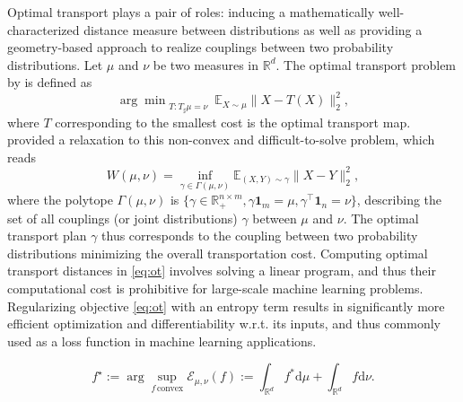 Optimal transport plays a pair of roles: inducing a mathematically well-characterized distance measure between distributions as well as providing a geometry-based approach to realize couplings between two probability distributions.
Let $\mu$ and $\nu$ be two measures in $\mathbb{R}^d$. 
The optimal transport problem by \citet{monge1781histoire} is defined as
\begin{equation}\label{eq:monge}
    {\arg \min}_{T : T_\sharp \mu = \nu} \enspace \mathbb{E}_{X \sim \mu}\|X-T(X)\|^2_2,
\end{equation}
where $T$ corresponding to the smallest cost is the optimal transport map.
\citet{kantorovich1942transfer} provided a relaxation to this non-convex and difficult-to-solve problem, which reads
\begin{equation}\label{eq:ot}
W(\mu, \nu)= \inf _{\gamma \in \Gamma(\mu, \nu)} \mathbb{E}_{(X, Y) \sim \gamma}\|X-Y\|^2_2,
\end{equation}
where the polytope $\Gamma(\mu, \nu)$ is $\{\gamma \in\mathbb{R}^{n \times m}_+, \gamma\mathbf{1}_m =\mu, \gamma^\top\mathbf{1}_n=\nu\}$, describing the set of all couplings (or joint distributions) $\gamma$ between $\mu$ and $\nu$.
The optimal transport plan $\gamma$ thus corresponds to the coupling between two probability distributions minimizing the overall transportation cost. 
Computing optimal transport distances in \eqref{eq:ot} involves solving a linear program, and thus their computational cost is prohibitive for large-scale machine learning problems. Regularizing objective \eqref{eq:ot} with an entropy term results in significantly more efficient optimization \citep{cuturi2013sinkhorn} and differentiability w.r.t. its inputs, and thus commonly used
as a loss function in machine learning applications.

\begin{equation}\label{eq:dual}
f^\star:=\arg\!\!\sup_{f\,\text{convex}}\mathcal{E}_{\mu,\nu}(f):=\int_{\mathbb{R}^d}f^*\textrm{d}\mu+\int_{\mathbb{R}^d}f\textrm{d}\nu.
\end{equation}


